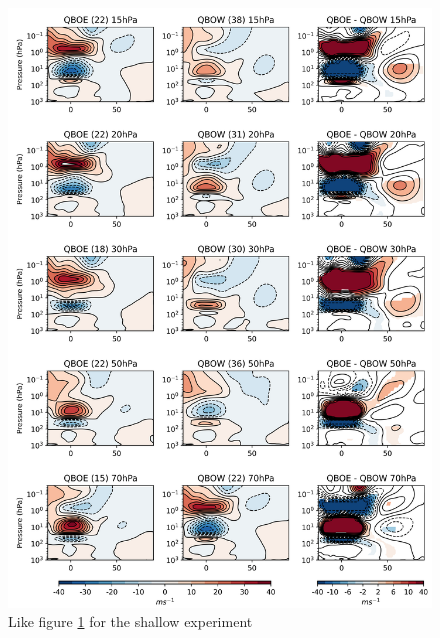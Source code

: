 \begin{figure}[h!]
\begin{center}
\noindent\includegraphics[width = \linewidth]{Figures/Figures-deepQBO/ZMZW_composites_QBO_phases_U_s_DJFMQBO_vs_DJFM_70hPa_5thresh.png}
\caption[Climatological seasonal cycle of equatorial ZMZW in QBO experiments]{Like figure \ref{fig:HT_deep} for the shallow experiment}
\label{fig:HT_deep}
\end{center}
\end{figure}





